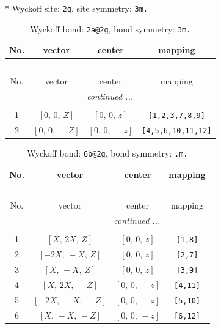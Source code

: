 \documentclass[fleqn,8pt]{jsarticle}
\begin{document}
* Wyckoff site: {\tt 2g}, site symmetry: {\tt 3m.}
\renewcommand{\arraystretch}{1.2}
\begin{longtable}{cccc}
\caption{Wyckoff bond: {\tt 2a@2g}, bond symmetry: {\tt 3m.}}
 \\
 \hline \hline
No. & vector & center & mapping \\ \hline \endfirsthead

\multicolumn{3}{l}{\tablename\ \thetable{}} \\
 \hline \hline
No. & vector & center & mapping \\ \hline \endhead

 \hline \hline
\multicolumn{3}{r}{\footnotesize\it continued ...} \\ \endfoot

 \hline \hline
\multicolumn{3}{r}{} \\ \endlastfoot

1 & $\left[ 0,\, 0,\, Z \right]$ & $\left[ 0,\, 0,\, z \right]$ & {\tt [1,2,3,7,8,9]} \\ \hline
2 & $\left[ 0,\, 0,\, - Z \right]$ & $\left[ 0,\, 0,\, - z \right]$ & {\tt [4,5,6,10,11,12]} \\
\end{longtable}
\renewcommand{\arraystretch}{1.2}
\begin{longtable}{cccc}
\caption{Wyckoff bond: {\tt 6b@2g}, bond symmetry: {\tt .m.}}
 \\
 \hline \hline
No. & vector & center & mapping \\ \hline \endfirsthead

\multicolumn{3}{l}{\tablename\ \thetable{}} \\
 \hline \hline
No. & vector & center & mapping \\ \hline \endhead

 \hline \hline
\multicolumn{3}{r}{\footnotesize\it continued ...} \\ \endfoot

 \hline \hline
\multicolumn{3}{r}{} \\ \endlastfoot

1 & $\left[ X,\, 2 X,\, Z \right]$ & $\left[ 0,\, 0,\, z \right]$ & {\tt [1,8]} \\ \hline
2 & $\left[ - 2 X,\, - X,\, Z \right]$ & $\left[ 0,\, 0,\, z \right]$ & {\tt [2,7]} \\ \hline
3 & $\left[ X,\, - X,\, Z \right]$ & $\left[ 0,\, 0,\, z \right]$ & {\tt [3,9]} \\ \hline
4 & $\left[ X,\, 2 X,\, - Z \right]$ & $\left[ 0,\, 0,\, - z \right]$ & {\tt [4,11]} \\ \hline
5 & $\left[ - 2 X,\, - X,\, - Z \right]$ & $\left[ 0,\, 0,\, - z \right]$ & {\tt [5,10]} \\ \hline
6 & $\left[ X,\, - X,\, - Z \right]$ & $\left[ 0,\, 0,\, - z \right]$ & {\tt [6,12]} \\
\end{longtable}
\end{document}
